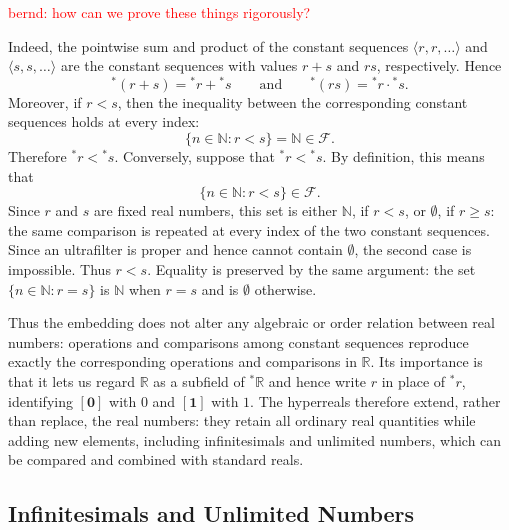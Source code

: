 \textcolor{red}{bernd: how can we prove these things rigorously?}


Indeed, the pointwise sum and product of the constant sequences
$\langle r,r,\ldots\rangle$ and $\langle s,s,\ldots\rangle$ are the
constant sequences with values $r+s$ and $rs$, respectively. Hence
\[
{}^*(r+s)={}^*r+{}^*s
\qquad\text{and}\qquad
{}^*(rs)={}^*r\cdot{}^*s.
\]
Moreover, if $r<s$, then the inequality between the corresponding constant
sequences holds at every index:
\[
\{n\in\mathbb{N}:r<s\}=\mathbb{N}\in\mathcal{F}.
\]
Therefore ${}^*r<{}^*s$. Conversely, suppose that
${}^*r<{}^*s$. By definition, this means that
\[
\{n\in\mathbb{N}:r<s\}\in\mathcal{F}.
\]
Since $r$ and $s$ are fixed real numbers, this set is either
$\mathbb{N}$, if $r<s$, or $\emptyset$, if $r\geq s$: the same comparison
is repeated at every index of the two constant sequences. Since an
ultrafilter is proper and hence cannot contain $\emptyset$, the second
case is impossible. Thus $r<s$. Equality is preserved by the same argument:
the set $\{n\in\mathbb{N}:r=s\}$ is $\mathbb{N}$ when $r=s$ and is
$\emptyset$ otherwise.

Thus the embedding does not alter any algebraic or order relation between
real numbers: operations and comparisons among constant sequences reproduce
exactly the corresponding operations and comparisons in $\mathbb{R}$.
Its importance is that it lets us regard $\mathbb{R}$ as a subfield of
${}^*\mathbb{R}$ and hence write $r$ in place of ${}^*r$, identifying
$[\textbf{0}]$ with $0$ and $[\textbf{1}]$ with $1$. The hyperreals therefore extend, rather
than replace, the real numbers: they retain all ordinary real quantities
while adding new elements, including infinitesimals and unlimited numbers,
which can be compared and combined with standard reals.

\subsection{Infinitesimals and Unlimited Numbers}


